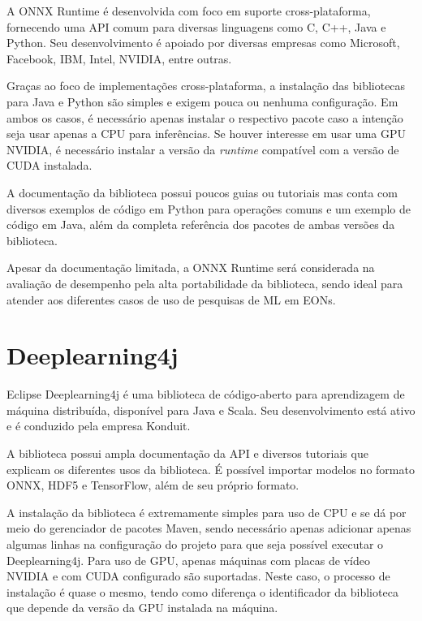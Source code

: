 A ONNX Runtime é desenvolvida com foco em suporte cross-plataforma, fornecendo uma \acrshort{API} comum para diversas linguagens como C, C++, Java e Python. Seu desenvolvimento é apoiado por diversas empresas como Microsoft, Facebook, IBM, Intel, NVIDIA, entre outras.

Graças ao foco de implementações cross-plataforma, a instalação das bibliotecas para Java e Python são simples e exigem pouca ou nenhuma configuração. Em ambos os casos, é necessário apenas instalar o respectivo pacote caso a intenção seja usar apenas a CPU para inferências. Se houver interesse em usar uma GPU NVIDIA, é necessário instalar a versão da \textit{runtime} compatível com a versão de \acrshort{CUDA} instalada.

A documentação da biblioteca possui poucos guias ou tutoriais mas conta com diversos exemplos de código em Python para operações comuns e um exemplo de código em Java, além da completa referência dos pacotes de ambas versões da biblioteca.

Apesar da documentação limitada, a ONNX Runtime será considerada na avaliação de desempenho pela alta portabilidade da biblioteca, sendo ideal para atender aos diferentes casos de uso de pesquisas de ML em EONs.

\section{Deeplearning4j}

Eclipse Deeplearning4j \cite{ml_site_deeplearning4j} é uma biblioteca de código-aberto para aprendizagem de máquina distribuída, disponível para Java e Scala. Seu desenvolvimento está ativo e é conduzido pela empresa Konduit.

A biblioteca possui ampla documentação da \acrshort{API} e diversos tutoriais que explicam os diferentes usos da biblioteca. É possível importar modelos no formato ONNX, HDF5 e TensorFlow, além de seu próprio formato.

A instalação da biblioteca é extremamente simples para uso de CPU e se dá por meio do gerenciador de pacotes Maven, sendo necessário apenas adicionar apenas algumas linhas na configuração do projeto para que seja possível executar o Deeplearning4j. Para uso de GPU, apenas máquinas com placas de vídeo NVIDIA e com \acrshort{CUDA} configurado são suportadas. Neste caso, o processo de instalação é quase o mesmo, tendo como diferença o identificador da biblioteca que depende da versão da GPU instalada na máquina.

